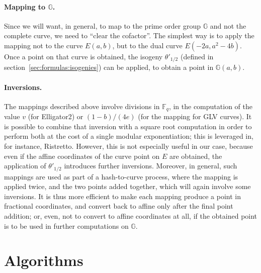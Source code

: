\documentclass{llncs}
\newcommand{\bF}{\mathbb{F}}
\newcommand{\bG}{\mathbb{G}}
\begin{document}
\paragraph{Mapping to $\bG$.} Since we will want, in general, to map to
the prime order group $\bG$ and not the complete curve, we need to
``clear the cofactor''. The simplest way is to apply the mapping not to
the curve $E(a, b)$, but to the dual curve $E(-2a, a^2-4b)$. Once a
point on that curve is obtained, the isogeny $\theta'_{1/2}$ (defined in
section~\ref{sec:formulas:isogenies}) can be applied, to obtain a point
in $\bG(a, b)$.

\paragraph{Inversions.} The mappings described above involve divisions
in $\bF_q$, in the computation of the value $v$ (for Elligator2) or
$(1-b)/(4e)$ (for the mapping for GLV curves). It is possible to combine
that inversion with a square root computation in order to perform both
at the cost of a single modular exponentiation; this is leveraged in,
for instance, Ristretto\cite{RistrettoWeb}. However, this is not
especially useful in our case, because even if the affine coordinates of
the curve point on $E$ are obtained, the application of $\theta'_{1/2}$
introduces further inversions. Moreover, in general, such mappings are
used as part of a hash-to-curve process, where the mapping is applied
twice, and the two points added together, which will again involve some
inversions. It is thus more efficient to make each mapping produce a
point in fractional coordinates, and convert back to affine only after
the final point addition; or, even, not to convert to affine coordinates
at all, if the obtained point is to be used in further computations on
$\bG$.


\section{Algorithms}\label{sec:algorithms}
\end{document}

